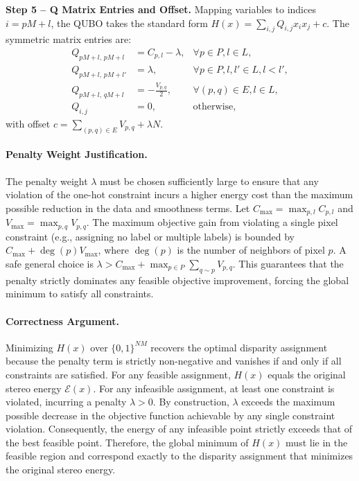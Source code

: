 \documentclass[12pt]{article}
\begin{document}
\textbf{Step 5 -- Q Matrix Entries and Offset.}
Mapping variables to indices $i = pM + l$, the QUBO takes the standard form $H(x) = \sum_{i,j} Q_{i,j} x_i x_j + c$. The symmetric matrix entries are:
\begin{align}
Q_{pM+l, \, pM+l} &= C_{p,l} - \lambda, & \forall p \in P, l \in L, \\
Q_{pM+l, \, pM+l'} &= \lambda, & \forall p \in P, l, l' \in L, l < l', \\
Q_{pM+l, \, qM+l} &= -\frac{V_{p,q}}{2}, & \forall (p,q) \in E, l \in L, \\
Q_{i,j} &= 0, & \text{otherwise},
\end{align}
with offset $c = \sum_{(p,q) \in E} V_{p,q} + \lambda N$.

\paragraph{Penalty Weight Justification.}
The penalty weight $\lambda$ must be chosen sufficiently large to ensure that any violation of the one-hot constraint incurs a higher energy cost than the maximum possible reduction in the data and smoothness terms. Let $C_{\max} = \max_{p,l} C_{p,l}$ and $V_{\max} = \max_{p,q} V_{p,q}$. The maximum objective gain from violating a single pixel constraint (e.g., assigning no label or multiple labels) is bounded by $C_{\max} + \deg(p) V_{\max}$, where $\deg(p)$ is the number of neighbors of pixel $p$. A safe general choice is $\lambda > C_{\max} + \max_{p \in P} \sum_{q \sim p} V_{p,q}$. This guarantees that the penalty strictly dominates any feasible objective improvement, forcing the global minimum to satisfy all constraints.

\paragraph{Correctness Argument.}
Minimizing $H(x)$ over $\{0,1\}^{NM}$ recovers the optimal disparity assignment because the penalty term is strictly non-negative and vanishes if and only if all constraints are satisfied. For any feasible assignment, $H(x)$ equals the original stereo energy $\mathcal{E}(x)$. For any infeasible assignment, at least one constraint is violated, incurring a penalty $\lambda > 0$. By construction, $\lambda$ exceeds the maximum possible decrease in the objective function achievable by any single constraint violation. Consequently, the energy of any infeasible point strictly exceeds that of the best feasible point. Therefore, the global minimum of $H(x)$ must lie in the feasible region and correspond exactly to the disparity assignment that minimizes the original stereo energy.
\end{document}
